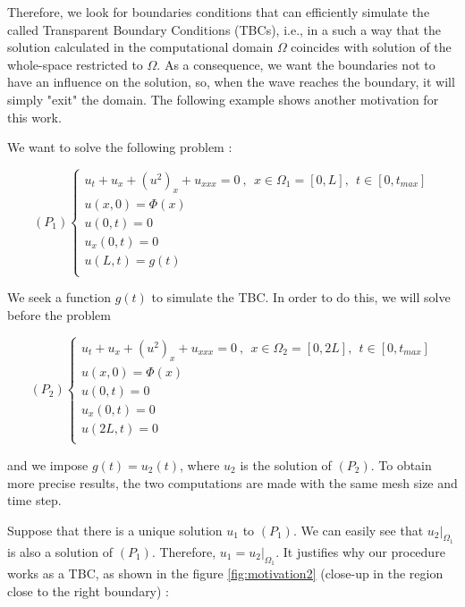 \indent Therefore, we look for boundaries conditions that can efficiently simulate the called Transparent Boundary Conditions (TBCs), i.e., in a such a way that the solution calculated in the computational domain $\Omega$ coincides with solution of the whole-space restricted to $\Omega$. As a consequence, we want the boundaries not to have an influence on the solution, so, when the wave reaches the boundary, it will simply "exit" the domain. The following example shows another motivation for this work.

\indent We want to solve the following problem :

\begin{equation}
    (P_1) \begin{cases}
    u_t + u_x + (u^2)_x + u_{xxx} = 0 \ , \ \ x \in \Omega_1 = [0,L], \ \ t \in [0, t_{max}] \\
    u(x,0) = \Phi(x) \\
    u(0,t) = 0 \\
    u_x(0,t) = 0 \\
    u(L,t) = g(t)  \\ 
    \end{cases}
\end{equation}

\indent We seek a function $g(t)$ to simulate the TBC. In order to do this, we will solve before the problem

\begin{equation}
    (P_2) \begin{cases}
    u_t + u_x + (u^2)_x + u_{xxx} = 0 \ , \ \ x \in \Omega_2 = [0,2L], \ \ t \in [0, t_{max}] \\
    u(x,0) = \Phi(x) \\
    u(0,t) = 0 \\
    u_x(0,t) = 0 \\
    u(2L,t) = 0  \\ 
    \end{cases}
\end{equation}

\noindent and we impose $g(t) = u_2(t)$, where $u_2$ is the solution of $(P_2)$. To obtain more precise results, the two computations are made with the same mesh size and time step.

\indent Suppose that there is a unique solution $u_1$ to $(P_1)$. We can easily see that $u_2|_{\Omega_1}$ is also a solution of $(P_1)$. Therefore, $u_1 = u_2|_{\Omega_1}$. It justifies why our procedure works as a TBC, as shown in the figure \ref{fig:motivation2} (close-up in the region close to the right boundary) :

